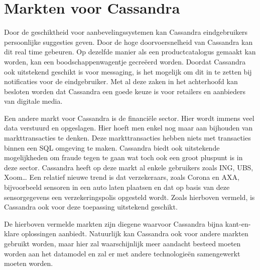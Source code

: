 \section{Markten voor Cassandra}
Door de geschiktheid voor aanbevelingssystemen kan Cassandra eindgebruikers persoonlijke suggesties geven.
Door de hoge doorvoersnelheid van Cassandra kan dit real time gebeuren.
Op dezelfde manier als een productcatalogus gemaakt kan worden, kan een boodschappenwagentje gecreëerd worden.
Doordat Cassandra ook uitstekend geschikt is voor messaging, is het mogelijk om dit in te zetten bij notificaties voor de eindgebruiker.
Met al deze zaken in het achterhoofd kan besloten worden dat Cassandra een goede keuze is voor retailers en aanbieders van digitale media.

Een andere markt voor Cassandra is de financiële sector.
Hier wordt immens veel data verstuurd en opgeslagen.
Hier hoeft men enkel nog maar aan bijhouden van markttransacties te denken.
Deze markttransacties hebben niets met transacties binnen een SQL omgeving te maken.
Cassandra biedt ook uitstekende mogelijkheden om fraude tegen te gaan wat toch ook een groot pluspunt is in deze sector.
Cassandra heeft op deze markt al enkele gebruikers zoals ING, UBS, Xoom\dots
Een relatief nieuwe trend is dat verzekeraars, zoals Corona en AXA, bijvoorbeeld sensoren in een auto laten plaatsen en dat op basis van deze sensorgegevens een verzekeringspolis opgesteld wordt.
Zoals hierboven vermeld, is Cassandra ook voor deze toepassing uitstekend geschikt.

De hierboven vermelde markten zijn diegene waarvoor Cassandra bijna kant-en-klare oplossingen aanbiedt.
Natuurlijk kan Cassandra ook voor andere markten gebruikt worden, maar hier zal waarschijnlijk meer aandacht besteed moeten worden aan het datamodel en zal er met andere technologieën samengewerkt moeten worden.
